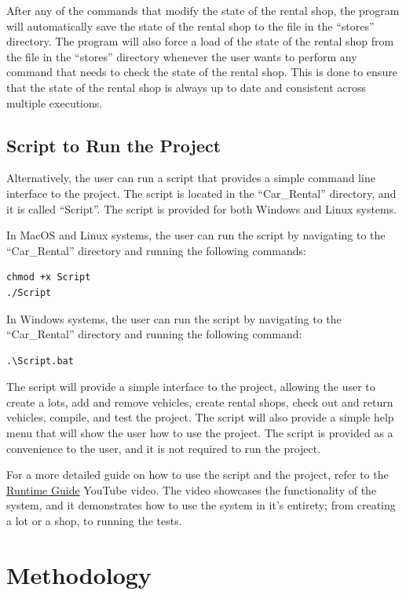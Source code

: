 \documentclass[conference]{IEEEtran}
\begin{document}
After any of the commands that modify the state of the rental shop, the program will automatically save the state of the rental shop to the file in the ``stores'' directory. The program will also force a load of the state of the rental shop from the file in the ``stores'' directory whenever the user wants to perform any command that needs to check the state of the rental shop. This is done to ensure that the state of the rental shop is always up to date and consistent across multiple executions.

\subsection{Script to Run the Project}
Alternatively, the user can run a script that provides a simple command line interface to the project. The script is located in the ``Car\_Rental'' directory, and it is called ``Script''. The script is provided for both Windows and Linux systems.

In MacOS and Linux systems, the user can run the script by navigating to the ``Car\_Rental'' directory and running the following commands:
\begin{lstlisting}[style=input]
chmod +x Script
./Script
\end{lstlisting}

In Windows systems, the user can run the script by navigating to the ``Car\_Rental'' directory and running the following command:
\begin{lstlisting}[style=input]
.\Script.bat
\end{lstlisting}

The script will provide a simple interface to the project, allowing the user to create a lots, add and remove vehicles, create rental shops, check out and return vehicles, compile, and test the project. The script will also provide a simple help menu that will show the user how to use the project. The script is provided as a convenience to the user, and it is not required to run the project.

For a more detailed guide on how to use the script and the project, refer to the \href{https://www.youtube.com/watch?v=Xhl6brNmHuo&t=111s}{Runtime Guide} YouTube video. The video showcases the functionality of the system, and it demonstrates how to use the system in it's entirety; from creating a lot or a shop, to running the tests. 

\section{Methodology}
\end{document}
